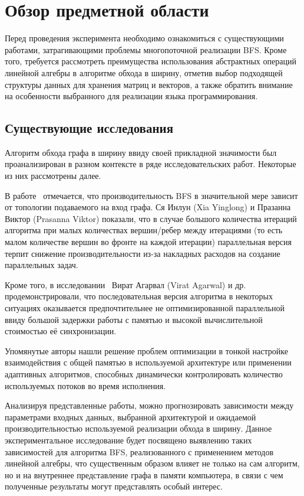 
\section{Обзор предметной области}
\label{sec:relatedworks}
Перед проведения эксперимента необходимо ознакомиться с существующими работами, затрагивающими проблемы многопоточной реализации BFS. Кроме того, требуется рассмотреть преимущества использования абстрактных операций линейной алгебры в алгоритме обхода в ширину, отметив выбор подходящей структуры данных для хранения матриц и векторов, а также обратить внимание на особенности выбранного для реализации языка программирования.



\subsection{Существующие исследования}
Алгоритм обхода графа в ширину ввиду своей прикладной значимости был проанализирован в разном контексте в ряде исследовательских работ. Некоторые из них рассмотрены далее.

В работе~\cite{adaptiveBFS} отмечается, что производительность BFS в значительной мере зависит от топологии подаваемого на вход графа. Ся Инлун (Xia Yinglong) и Празанна Виктор (Prasanna Viktor) показали, что в случае большого количества итераций алгоритма при малых количествах вершин/ребер между итерациями (то есть малом количестве вершин во фронте на каждой итерации) параллельная версия терпит снижение производительности из-за накладных расходов на создание параллельных задач.

Кроме того, в исследовании~\cite{scalableBFS} Вират Агарвал (Virat Agarwal) и др. продемонстрировали, что последовательная версия алгоритма в некоторых ситуациях оказывается предпочтительнее не оптимизированной параллельной ввиду большой задержки работы с памятью и высокой вычислительной стоимостью её синхронизации. 

Упомянутые авторы нашли решение проблем оптимизации в тонкой настройке взаимодействия с общей памятью в используемой архитектуре или применении адаптивных алгоритмов, способных динамически контролировать количество используемых потоков во время исполнения.

Анализируя представленные работы, можно прогнозировать зависимости между параметрами входных данных, выбранной архитектурой и ожидаемой производительностью используемой реализации обхода в ширину. Данное экспериментальное исследование будет посвящено выявлению таких зависимостей для алгоритма BFS, реализованного с применением методов линейной алгебры, что существенным образом влияет не только на сам алгоритм, но и на внутреннее представление графа в памяти компьютера, в связи с чем полученные результаты могут представлять особый интерес.




